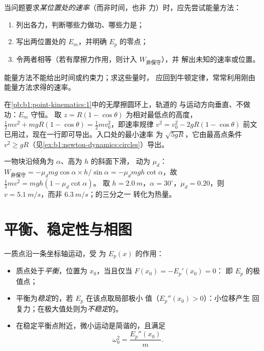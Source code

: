\begin{method}[用能量求解]\label{met:b1:work-and-energy:method}
当问题要求\emph{某位置处的速率}（而非时间，也非
力）时，应先尝试能量方法：
\begin{enumerate}
  \item 列出各力，判断哪些力做功、哪些力是；
  \item 写出两位置处的 $E_m$，并明确 $E_p$ 的零点；
        \item 令两者相等（若有摩擦力作用，则计入 $W_{\text{非保守}}$），并
        解出未知的速率或位置。
\end{enumerate}
能量方法不能给出时间或约束力；求这些量时，
应回到牛顿定律，常常利用刚由能量方法求得的速率。
\end{method}

\begin{example}[圆环轨道的速率规律]\label{ex:b1:work-and-energy:loop}
在\cref{pb:b1:point-kinematics:1}中的无摩擦圆环上，轨道的
与运动方向垂直、不做功：$E_m$ 守恒。
取 $z = R(1 - \cos\theta)$ 为相对最低点的高度，$\tfrac12 mv^2 + mgR(1 -
\cos\theta) = \tfrac12 mv_0^2$，即速率规律 $v^2 = v_0^2 - 2gR(1 -
\cos\theta)$ 前文已用过，现在一行即可导出。入口处的最小速率
为 $\sqrt{5gR}$，它由最高点条件
$v^2 \geq gR$（见\cref{ex:b1:newton-dynamics:circles}）导出。
\end{example}

\begin{example}[摩擦损失的能量]\label{ex:b1:work-and-energy:friction}
一物块沿倾角为 $\alpha$、高为 $h$ 的斜面下滑，
动为 $\mu_d$：$W_{\text{非保守}} = -\mu_dmg\cos\alpha \times
h/\sin\alpha = -\mu_dmgh\cot\alpha$，故 $\tfrac12 mv^2 = mgh(1 - \mu_d\cot\alpha)$。
取 $h = \qty{2.0}{m}$，$\alpha = 30^\circ$，$\mu_d = 0.20$，则 $v =
\qty{5.1}{m/s}$，而非 $\qty{6.3}{m/s}$；的三分之一
转化为热量。
\end{example}

\section{平衡、稳定性与相图}

\begin{proposition}[一维情形下的平衡与稳定性]\label{prop:b1:work-and-energy:stability}
一质点沿一条坐标轴运动，受
为 $E_p(x)$ 的作用：
\begin{itemize}
  \item 质点处于\emph{平衡}，位置为 $x_0$，当且仅当 $F(x_0) = -E_p'(x_0) = 0$：
        即 $E_p$ 的极值点；
  \item 平衡为\emph{稳定}的，若 $E_p$ 在该点取局部极小
        值（$E_p''(x_0) > 0$）：小位移产生
        回复力；在极大值处则为\emph{不稳定}的。
  \item 在稳定平衡点附近，微小运动是简谐的，且满足
        \[
        \omega_0^2 = \frac{E_p''(x_0)}{m} .
        \]
\end{itemize}
\end{proposition}

